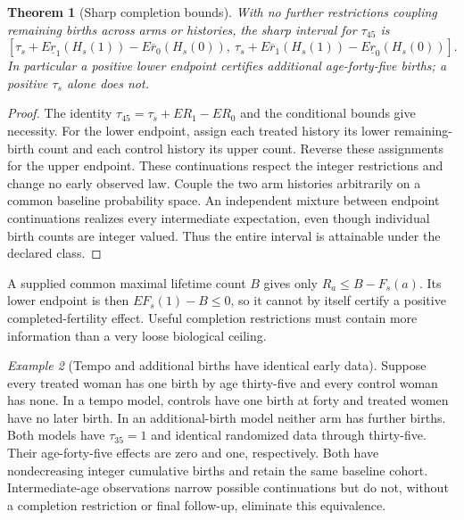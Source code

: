 \documentclass[11pt]{article}
\newtheorem{theorem}{Theorem}
\theoremstyle{remark}
\newtheorem{example}[theorem]{Example}
\begin{document}
\begin{theorem}[Sharp completion bounds]
With no further restrictions coupling remaining births across arms or histories, the sharp interval for $\tau_{45}$ is
\[
 \left[\tau_s+E\underline r_1(H_s(1))-E\overline r_0(H_s(0)),\
       \tau_s+E\overline r_1(H_s(1))-E\underline r_0(H_s(0))\right].
\]
In particular a positive lower endpoint certifies additional age-forty-five births; a positive $\tau_s$ alone does not.
\end{theorem}
\begin{proof}
The identity $\tau_{45}=\tau_s+ER_1-ER_0$ and the conditional bounds give necessity. For the lower endpoint, assign each treated history its lower remaining-birth count and each control history its upper count. Reverse these assignments for the upper endpoint. These continuations respect the integer restrictions and change no early observed law. Couple the two arm histories arbitrarily on a common baseline probability space. An independent mixture between endpoint continuations realizes every intermediate expectation, even though individual birth counts are integer valued. Thus the entire interval is attainable under the declared class.
\end{proof}
A supplied common maximal lifetime count $B$ gives only $R_a\le B-F_s(a)$. Its lower endpoint is then $EF_s(1)-B\le0$, so it cannot by itself certify a positive completed-fertility effect. Useful completion restrictions must contain more information than a very loose biological ceiling.

\begin{example}[Tempo and additional births have identical early data]
Suppose every treated woman has one birth by age thirty-five and every control woman has none. In a tempo model, controls have one birth at forty and treated women have no later birth. In an additional-birth model neither arm has further births. Both models have $\tau_{35}=1$ and identical randomized data through thirty-five. Their age-forty-five effects are zero and one, respectively. Both have nondecreasing integer cumulative births and retain the same baseline cohort. Intermediate-age observations narrow possible continuations but do not, without a completion restriction or final follow-up, eliminate this equivalence.
\end{example}
\end{document}

